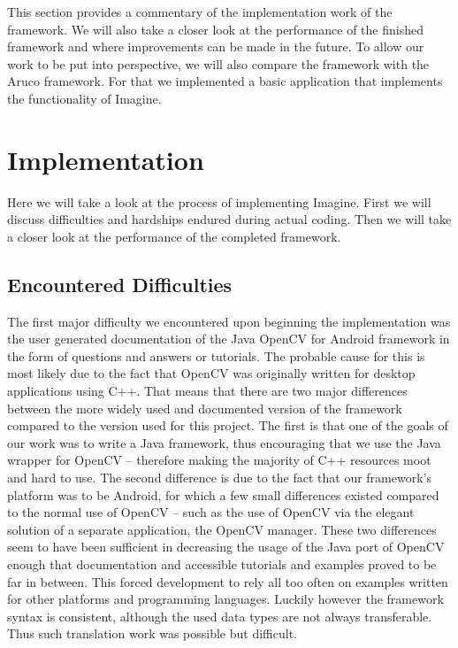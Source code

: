 This section provides a commentary of the implementation work of the framework.
We will also take a closer look at the performance of the finished framework and where improvements can be made in the future.
To allow our work to be put into perspective, we will also compare the framework with the Aruco framework.
For that we implemented a basic application that implements the functionality of Imagine.

\section{Implementation}
\label{implementation}

Here we will take a look at the process of implementing Imagine.
First we will discuss difficulties and hardships endured during actual coding.
Then we will take a closer look at the performance of the completed framework.

\subsection{Encountered Difficulties}

The first major difficulty we encountered upon beginning the implementation was the user generated documentation of the Java OpenCV for Android framework in the form of questions and answers or tutorials.
The probable cause for this is most likely due to the fact that OpenCV was originally written for desktop applications using C++.
That means that there are two major differences between the more widely used and documented version of the framework compared to the version used for this project.
The first is that one of the goals of our work was to write a Java framework, thus encouraging that we use the Java wrapper for OpenCV – therefore making the majority of C++ resources moot and hard to use.
The second difference is due to the fact that our framework's platform was to be Android, for which a few small differences existed compared to the normal use of OpenCV – such as the use of OpenCV via the elegant solution of a separate application, the OpenCV manager.
These two differences seem to have been sufficient in decreasing the usage of the Java port of OpenCV enough that documentation and accessible tutorials and examples proved to be far in between.
This forced development to rely all too often on examples written for other platforms and programming languages.
Luckily however the framework syntax is consistent, although the used data types are not always transferable.
Thus such translation work was possible but difficult.

